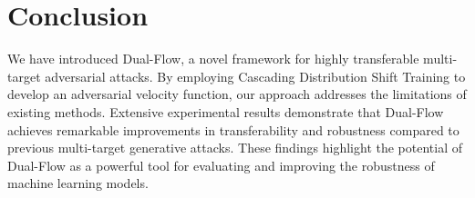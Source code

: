 \section{Conclusion}
We have introduced Dual-Flow, a novel framework for highly transferable multi-target adversarial attacks. By employing Cascading Distribution Shift Training to develop an adversarial velocity function, our approach addresses the limitations of existing methods. Extensive experimental results demonstrate that Dual-Flow achieves remarkable improvements in transferability and robustness compared to previous multi-target generative attacks. These findings highlight the potential of Dual-Flow as a powerful tool for evaluating and improving the robustness of machine learning models.
